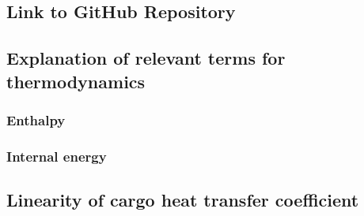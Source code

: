\subsection{Link to GitHub Repository}

\subsection{Explanation of relevant terms for thermodynamics}
\subsubsection{Enthalpy}

\subsubsection{Internal energy}



\subsection{Linearity of cargo heat transfer coefficient}


